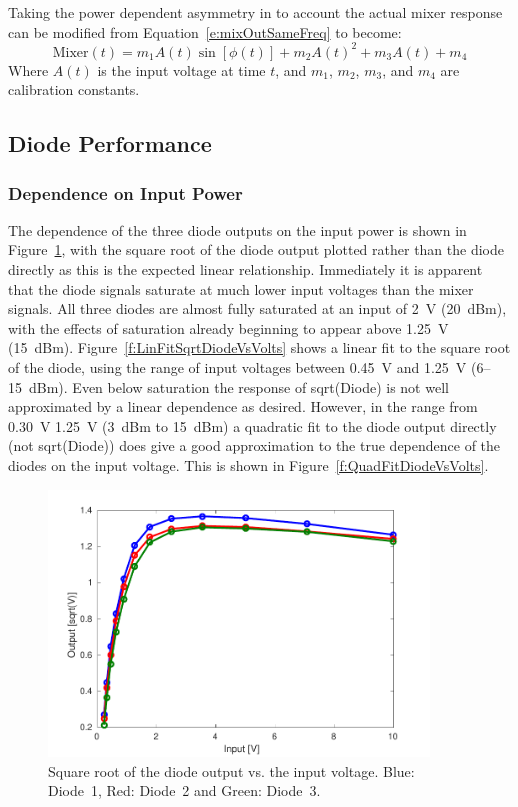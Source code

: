 Taking the power dependent asymmetry in to account the actual mixer response can be modified from Equation~\ref{e:mixOutSameFreq} to become:
\begin{equation}
\mathrm{Mixer}(t) = m_1A(t)\sin[\phi(t)] + m_2A(t)^2 + m_3A(t) + m_4
\label{e:actualMixerResponse}
\end{equation}
Where \(A(t)\) is the input voltage at time \(t\), and \(m_1\), \(m_2\), \(m_3\), and \(m_4\) are calibration constants.

\subsection{Diode Performance}
\label{ss:sigGenDiode}

\subsubsection{Dependence on Input Power}

The dependence of the three diode outputs on the input power is shown in Figure~\ref{f:SqrtDiodeVsVolts}, with the square root of the diode output plotted rather than the diode directly as this is the expected linear relationship. Immediately it is apparent that the diode signals saturate at much lower input voltages than the mixer signals. All three diodes are almost fully saturated at an input of 2~V (20~dBm), with the effects of saturation already beginning to appear above 1.25~V (15~dBm). Figure~\ref{f:LinFitSqrtDiodeVsVolts} shows a linear fit to the square root of the diode, using the range of input voltages between 0.45~V and 1.25~V (6--15~dBm). Even below saturation the response of sqrt(Diode) is not well approximated by a linear dependence as desired. However, in the range from 0.30~V 1.25~V (3~dBm to 15~dBm) a quadratic fit to the diode output directly (not sqrt(Diode)) does give a good approximation to the true dependence of the diodes on the input voltage. This is shown in Figure~\ref{f:QuadFitDiodeVsVolts}.

\begin{figure}
  \centering
  \includegraphics[width=0.9\textwidth]{Figures/phaseMons/SqrtDiodeVsVolts}
  \caption{Square root of the diode output vs. the input voltage. Blue: Diode~1, Red: Diode~2 and Green: Diode~3.}
  \label{f:SqrtDiodeVsVolts}
\end{figure}

